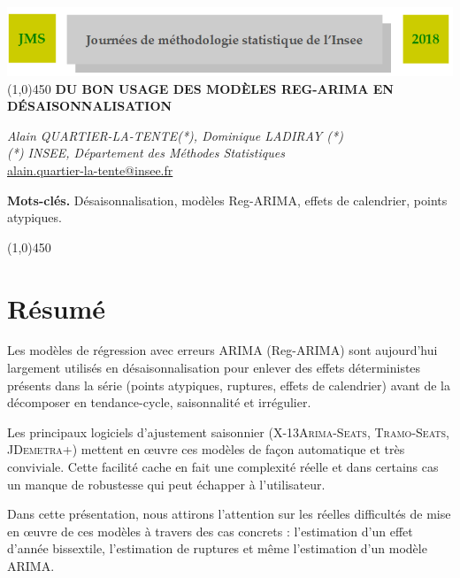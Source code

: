 \documentclass[12pt, a4paper, french]{article}
\begin{document}
\newcommand{\inter}[2]{\llbracket  #1\,,\, #2  \rrbracket}

\begin{center}
\includegraphics[width=15cm]{img/head_jms2018.png} 
\line(1,0){450}
\vspace{5mm}
\textbf{{\huge D}\Large U BON USAGE DES MOD\`ELES REG-ARIMA EN D\'ESAISONNALISATION}
\end{center}

\begin{center}
\textit{Alain QUARTIER-LA-TENTE(*), Dominique LADIRAY (*)} \\
\vspace{2mm}
\textit{(*) INSEE, Département des Méthodes Statistiques}\\ 
\vspace{2mm}
\url{alain.quartier-la-tente@insee.fr} 
\end{center}
\vspace{5mm}
\small{{\bf Mots-cl\'es.} Désaisonnalisation, modèles Reg-ARIMA, effets de calendrier, points atypiques.}

\begin{center}
\line(1,0){450}
\end{center}


\section*{Résumé}
Les modèles de régression avec erreurs ARIMA (Reg-ARIMA) sont aujourd'hui largement utilisés en désaisonnalisation pour enlever des effets déterministes présents dans la série (points atypiques, ruptures, effets de calendrier) avant de la décomposer en tendance-cycle, saisonnalité et irrégulier.

Les principaux logiciels d’ajustement saisonnier (\textsc{X-13Arima-Seats}, \textsc{Tramo-Seats}, \textsc{JDemetra+}) mettent en œuvre ces modèles de façon automatique et très conviviale. Cette facilité cache en fait une complexité réelle et dans certains cas un manque de robustesse qui peut échapper à l’utilisateur.

Dans cette présentation, nous attirons l'attention sur les réelles difficultés de mise en œuvre de ces modèles à travers des cas concrets : l’estimation d’un effet d’année bissextile, l’estimation de ruptures et même l’estimation d’un modèle ARIMA.
\end{document}
